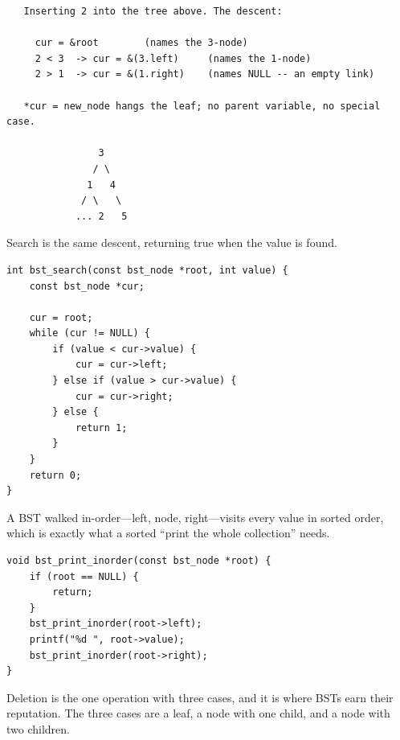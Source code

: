 \begin{verbatim}
   Inserting 2 into the tree above. The descent:

     cur = &root        (names the 3-node)
     2 < 3  -> cur = &(3.left)     (names the 1-node)
     2 > 1  -> cur = &(1.right)    (names NULL -- an empty link)

   *cur = new_node hangs the leaf; no parent variable, no special case.

                3
               / \
              1   4
             / \   \
            ... 2   5
\end{verbatim}

Search is the same descent, returning true when the value is found.

\begin{lstlisting}[caption={Search: the descent in miniature.}]
int bst_search(const bst_node *root, int value) {
    const bst_node *cur;

    cur = root;
    while (cur != NULL) {
        if (value < cur->value) {
            cur = cur->left;
        } else if (value > cur->value) {
            cur = cur->right;
        } else {
            return 1;
        }
    }
    return 0;
}
\end{lstlisting}

A BST walked in-order---left, node, right---visits every value in
sorted order, which is exactly what a sorted ``print the whole
collection'' needs.

\begin{lstlisting}[caption={In-order traversal yields sorted output.}]
void bst_print_inorder(const bst_node *root) {
    if (root == NULL) {
        return;
    }
    bst_print_inorder(root->left);
    printf("%d ", root->value);
    bst_print_inorder(root->right);
}
\end{lstlisting}

Deletion is the one operation with three cases, and it is where BSTs
earn their reputation. The three cases are a leaf, a node with one
child, and a node with two children.

